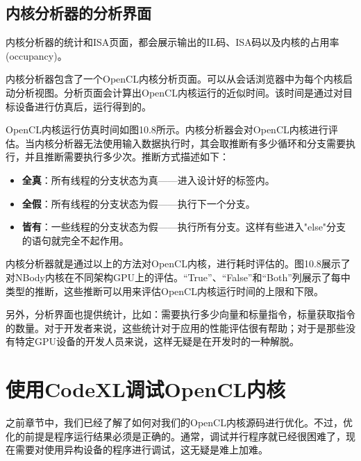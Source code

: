 
\subsection{内核分析器的分析界面}

内核分析器的统计和ISA页面，都会展示输出的IL码、ISA码以及内核的占用率(occupancy)。

内核分析器包含了一个OpenCL内核分析页面。可以从会话浏览器中为每个内核启动分析视图。分析页面会计算出OpenCL内核运行的近似时间。该时间是通过对目标设备进行仿真后，运行得到的。


OpenCL内核运行仿真时间如图10.8所示。内核分析器会对OpenCL内核进行评估。当内核分析器无法使用输入数据执行时，其会取推断有多少循环和分支需要执行，并且推断需要执行多少次。推断方式描述如下：

\begin{itemize}
\item \textbf{全真}：所有线程的分支状态为真——进入设计好的标签内。
\item \textbf{全假}：所有线程的分支状态为假——执行下一个分支。
\item \textbf{皆有}：一些线程的分支状态为假——执行所有分支。这样有些进入"else"分支的语句就完全不起作用。
\end{itemize}

内核分析器就是通过以上的方法对OpenCL内核，进行耗时评估的。图10.8展示了对NBody内核在不同架构GPU上的评估。“True”、“False”和“Both”列展示了每中类型的推断，这些推断可以用来评估OpenCL内核运行时间的上限和下限。

另外，分析界面也提供统计，比如：需要执行多少向量和标量指令，标量获取指令的数量。对于开发者来说，这些统计对于应用的性能评估很有帮助；对于是那些没有特定GPU设备的开发人员来说，这样无疑是在开发时的一种解脱。



\section{使用CodeXL调试OpenCL内核}

之前章节中，我们已经了解了如何对我们的OpenCL内核源码进行优化。不过，优化的前提是程序运行结果必须是正确的。通常，调试并行程序就已经很困难了，现在需要对使用异构设备的程序进行调试，这无疑是难上加难。

